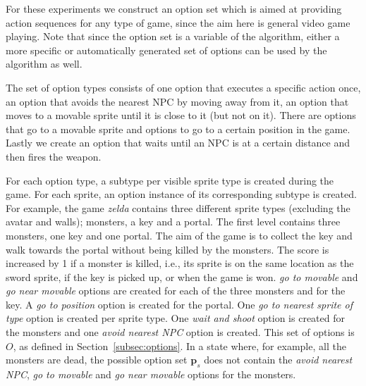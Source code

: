 For these experiments we construct an option set which is aimed at providing
action sequences for any type of game, since the aim here is general video game
playing.  Note that since the option set is a variable of the algorithm, either
a more specific or automatically generated set of options can be used by the
algorithm as well.

The set of option types consists of one option that executes a specific action
once, an option that avoids the nearest NPC by moving away from it, an option
that moves to a movable sprite until it is close to it (but not on it). There
are options that go to a movable sprite and options to go to a certain position
in the game.  Lastly we create an option that waits until an NPC is at a certain
distance and then fires the weapon.

For each option type, a subtype per visible sprite type is created during the
game. For each sprite, an option instance of its corresponding subtype is
created. For example, the game \textit{zelda} contains three different sprite
types (excluding the avatar and walls); monsters, a key and a portal. The first
level contains three monsters, one key and one portal. The aim of the game is to
collect the key and walk towards the portal without being killed by the
monsters. The score is increased by 1 if a monster is killed, i.e., its sprite
is on the same location as the sword sprite, if the key is picked up, or when
the game is won.  \emph{go to movable} and \emph{go near movable} options are
created for each of the three monsters and for the key. A \emph{go to position}
option is created for the portal.  One \emph{go to nearest sprite of type}
option is created per sprite type. One \emph{wait and shoot} option is created
for the monsters and one \emph{avoid nearest NPC} option is created. This set of
options is $O$, as defined in Section~\ref{subsec:options}. In a state where,
for example, all the monsters are dead, the possible option set $\mathbf{p}_s$
does not contain the \emph{avoid nearest NPC}, \emph{go to movable} and \emph{go
near movable} options for the monsters.

